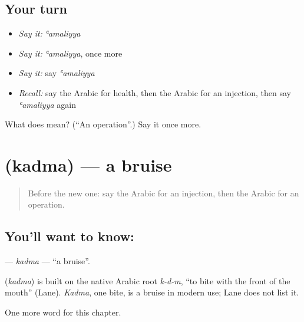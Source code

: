 \subsection*{Your turn}
\begin{itemize}
\raggedright
  \item \emph{Say it:} \emph{ʿamaliyya}
  \item \emph{Say it:} \emph{ʿamaliyya}, once more
  \item \emph{Say it:} say \emph{ʿamaliyya}
  \item \emph{Recall:} say the Arabic for health, then the Arabic for an injection, then say \emph{ʿamaliyya} again
\end{itemize}

\begin{tcolorbox}[breakable,colback=teal!4,colframe=teal!35!black,title={Before you move on}]
What does  mean? (\textquotedblleft{}An operation\textquotedblright{}.) Say it once more.
\end{tcolorbox}
\section[\texorpdfstring{\ar{كدمة} (kadma)}{كدمة (kadma)}]{ (kadma) — a bruise}

\label{lesson:AR-C201-kadma}



\begin{quote}
Before the new one: say the Arabic for an injection, then the Arabic for an operation.
\end{quote}

\subsection*{You'll want to know: }
\textbf{} — \emph{kadma} — \textquotedblleft{}a bruise\textquotedblright{}.

\begin{cousinweb}
\textbf{} (\emph{kadma}) is built on the native Arabic root \emph{k-d-m}, \textquotedblleft{}to bite with the front of the mouth\textquotedblright{} (Lane). \emph{Kadma}, one bite, is a bruise in modern use; Lane does not list it.
\end{cousinweb}

\begin{grammarlens}[title={What you've built}]
One more word for this chapter.
\end{grammarlens}

